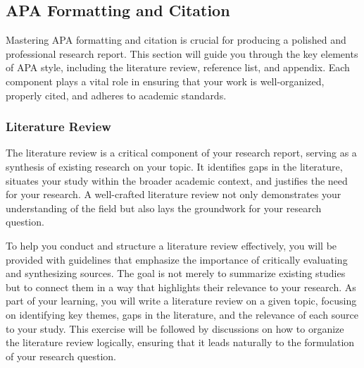 \documentclass[
]{book}
\begin{document}
\subsection{APA Formatting and Citation}\label{apa-formatting-and-citation}

Mastering APA formatting and citation is crucial for producing a polished and professional research report. This section will guide you through the key elements of APA style, including the literature review, reference list, and appendix. Each component plays a vital role in ensuring that your work is well-organized, properly cited, and adheres to academic standards.

\subsubsection{Literature Review}\label{literature-review}

The literature review is a critical component of your research report, serving as a synthesis of existing research on your topic. It identifies gaps in the literature, situates your study within the broader academic context, and justifies the need for your research. A well-crafted literature review not only demonstrates your understanding of the field but also lays the groundwork for your research question.

To help you conduct and structure a literature review effectively, you will be provided with guidelines that emphasize the importance of critically evaluating and synthesizing sources. The goal is not merely to summarize existing studies but to connect them in a way that highlights their relevance to your research. As part of your learning, you will write a literature review on a given topic, focusing on identifying key themes, gaps in the literature, and the relevance of each source to your study. This exercise will be followed by discussions on how to organize the literature review logically, ensuring that it leads naturally to the formulation of your research question.
\end{document}
